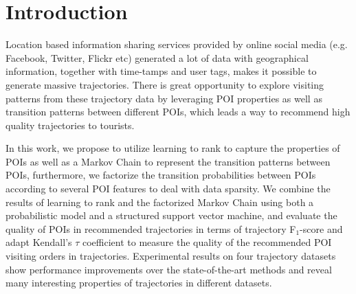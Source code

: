 \section{Introduction}
\label{sec:introduction}
Location based information sharing services provided by online social media 
(e.g. Facebook, Twitter, Flickr etc) generated a lot of data with geographical information, 
together with time-tamps and user tags, makes it possible to generate massive trajectories.
There is great opportunity to explore visiting patterns from these trajectory data by leveraging POI properties 
as well as transition patterns between different POIs, which leads a way to recommend high quality trajectories to tourists.

In this work, we propose to utilize learning to rank to capture the properties of POIs as well as a Markov Chain to 
represent the transition patterns between POIs, furthermore, we factorize the transition probabilities between POIs
according to several POI features to deal with data sparsity.
We combine the results of learning to rank and the factorized Markov Chain using both a probabilistic model and a structured
support vector machine, and evaluate the quality of POIs in recommended trajectories in terms of trajectory F$_1$-score\cite{ijcai15} and 
adapt Kendall's $\tau$ coefficient\cite{kendalltau} to measure the quality of the recommended POI visiting orders in trajectories.
Experimental results on four trajectory datasets show performance improvements over the state-of-the-art methods and 
reveal many interesting properties of trajectories in different datasets.
